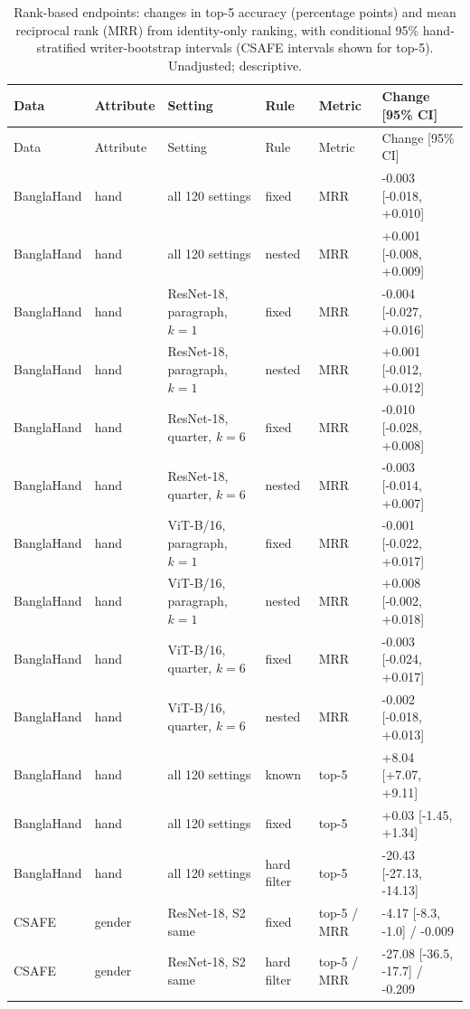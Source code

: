 \documentclass[10pt,a4paper]{article}
\begin{document}
{\footnotesize\setlength{\tabcolsep}{3pt}
\begin{longtable}{llllll}
\caption{Rank-based endpoints: changes in top-5 accuracy (percentage points) and mean reciprocal rank (MRR) from identity-only ranking, with conditional 95\% hand-stratified writer-bootstrap intervals (CSAFE intervals shown for top-5). Unadjusted; descriptive.}\label{tab:rank}\\
\toprule Data & Attribute & Setting & Rule & Metric & Change [95\% CI]\\\midrule
\endfirsthead
\toprule Data & Attribute & Setting & Rule & Metric & Change [95\% CI]\\\midrule
\endhead
BanglaHand & hand & all 120 settings & fixed & MRR & -0.003 [-0.018, +0.010] \\
BanglaHand & hand & all 120 settings & nested & MRR & +0.001 [-0.008, +0.009] \\
BanglaHand & hand & ResNet-18, paragraph, $k=1$ & fixed & MRR & -0.004 [-0.027, +0.016] \\
BanglaHand & hand & ResNet-18, paragraph, $k=1$ & nested & MRR & +0.001 [-0.012, +0.012] \\
BanglaHand & hand & ResNet-18, quarter, $k=6$ & fixed & MRR & -0.010 [-0.028, +0.008] \\
BanglaHand & hand & ResNet-18, quarter, $k=6$ & nested & MRR & -0.003 [-0.014, +0.007] \\
BanglaHand & hand & ViT-B/16, paragraph, $k=1$ & fixed & MRR & -0.001 [-0.022, +0.017] \\
BanglaHand & hand & ViT-B/16, paragraph, $k=1$ & nested & MRR & +0.008 [-0.002, +0.018] \\
BanglaHand & hand & ViT-B/16, quarter, $k=6$ & fixed & MRR & -0.003 [-0.024, +0.017] \\
BanglaHand & hand & ViT-B/16, quarter, $k=6$ & nested & MRR & -0.002 [-0.018, +0.013] \\
BanglaHand & hand & all 120 settings & known & top-5 & +8.04 [+7.07, +9.11] \\
BanglaHand & hand & all 120 settings & fixed & top-5 & +0.03 [-1.45, +1.34] \\
BanglaHand & hand & all 120 settings & hard filter & top-5 & -20.43 [-27.13, -14.13] \\
\midrule
CSAFE & gender & ResNet-18, S2 same & fixed & top-5 / MRR & -4.17 [-8.3, -1.0] / -0.009 \\
CSAFE & gender & ResNet-18, S2 same & hard filter & top-5 / MRR & -27.08 [-36.5, -17.7] / -0.209 \\

\end{longtable}}
\end{document}
